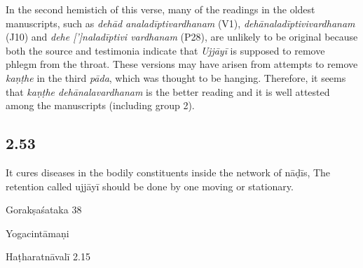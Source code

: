 \begin{ekdosis}
\begin{philcomm}[hp02_052]
In the second hemistich of this verse, many of the readings in the oldest manuscripts, such as \emph{dehād analadīptivardhanam} (V1), \emph{dehānaladīptivivardhanam} (J10) and \emph{dehe [’]naladīptivi vardhanam} (P28), are unlikely to be original because both the source and testimonia indicate that \emph{Ujjāyī} is supposed to remove phlegm from the throat. These versions may have arisen from attempts to remove \emph{kaṇṭhe} in the third \emph{pāda}, which was thought to be hanging. Therefore, it seems that \emph{kaṇṭhe dehānalavardhanam} is the better reading and it is well attested among the manuscripts (including group 2).
\end{philcomm}

\subsection*{2.53}
\begin{translation}[hp02_053]
It cures diseases in the bodily constituents inside the network of nāḍīs,
The retention called ujjāyī should be done by one moving or stationary.
\end{translation}

\begin{sources}[hp02_053]
Gorakṣaśataka 38

\begin{versinnote}
\end{versinnote}
\end{sources}

\begin{testimonia}[hp02_053]
Yogacintāmaṇi

\begin{versinnote}
\end{versinnote}
Haṭharatnāvalī 2.15

\begin{versinnote}
\end{versinnote}
\end{testimonia}


\end{ekdosis}
